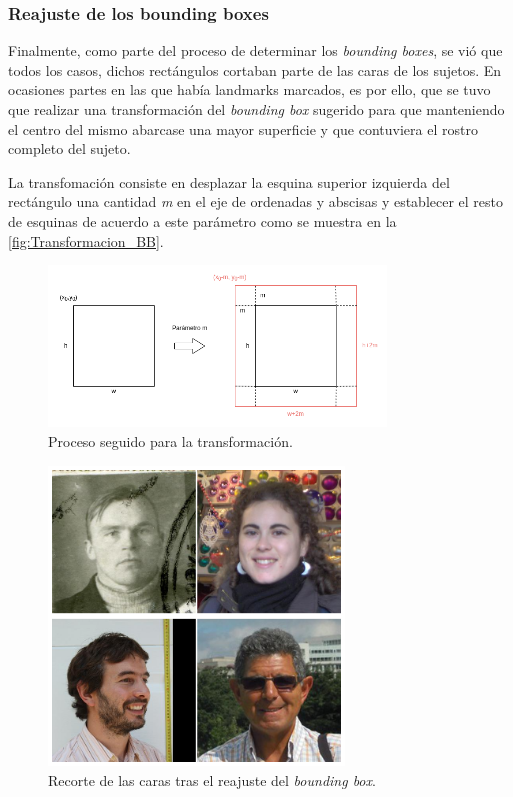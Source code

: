         \subsubsection{Reajuste de los bounding boxes}
            \noindent Finalmente, como parte del proceso de determinar los \textit{bounding boxes}, se vió que todos los casos, dichos rectángulos cortaban parte de las caras de los sujetos. En ocasiones partes en las que había landmarks marcados, es por ello, que se tuvo que realizar una transformación del \textit{bounding box} sugerido para que manteniendo el centro del mismo abarcase una mayor superficie y que contuviera el rostro completo del sujeto. 

            \medskip

            \noindent La transfomación consiste en desplazar la esquina superior izquierda del rectángulo una cantidad \textit{m} en el eje de ordenadas y abscisas y establecer el resto de esquinas de acuerdo a este parámetro como se muestra en la \autoref{fig:Transformacion_BB}.


            \begin{figure}[!h]
                \centering
                \includegraphics[width=0.8\textwidth]{img/Transformacion_rectangulo.png}
                \caption{Proceso seguido para la transformación.}
                \label{fig:Transformacion_BB}
            \end{figure}

            \begin{figure}[!h]
                \centering
                \includegraphics[width=0.7\textwidth]{img/imagenes_ejemplo_cropping.png}
                \caption{Recorte de las caras tras el reajuste del \textit{bounding box}.}
                \label{fig:Reajuste_bb}
            \end{figure}



